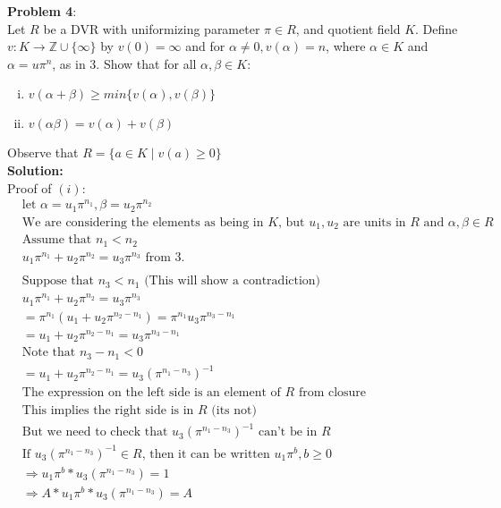 \documentclass[11pt]{article}
\newcommand{\prob}[3]{\begin{flushleft}
        \textbf{Problem #1}: \\
        #2 
		\textbf{Solution:} 
		#3

\end{flushleft}}
\begin{document}
\prob{4}{
  Let $R$ be a DVR with uniformizing parameter $\pi \in R$, and quotient field $K$. Define $v : K \rightarrow \mathbb{Z} \cup \{ \infty \}$ by $v(0) = \infty$ and for $\alpha \neq 0, v(\alpha) =n$, where $\alpha \in K$ and $\alpha = u \pi^n$, as in 3. Show that for all $\alpha, \beta \in K$:
  \begin{enumerate}[(i)]
    \item $v(\alpha + \beta) \geq min\{ v(\alpha), v(\beta) \}$
    \item $v(\alpha \beta) = v(\alpha) + v(\beta)$
  \end{enumerate}
  Observe that $R = \{ a \in K \mid v(a) \geq 0 \}$ \\
}{ \\
  Proof of $(i)$:
  \newline
\begin{align*}
&\text{let } \alpha = u_1 \pi ^ {n_1}, \beta = u_2 \pi ^{n_2}\\
&\text{We are considering the elements as being in $K$, but $u_1, u_2$ are units in $R$ and $\alpha, \beta \in R$}\\
&\text{Assume that $n_1 < n_2$}\\
&u_1 \pi ^ {n_1} + u_2 \pi ^{n_2} = u_3 \pi ^ {n_3} \text{ from 3.}\\
&\\
&\text{Suppose that $n_3 < n_1$ (This will show a contradiction)}\\
&u_1 \pi ^ {n_1} + u_2 \pi ^{n_2} = u_3 \pi ^{ n_3}\\
& = \pi ^ {n_1}(u_1 + u_2 \pi ^{n_2-n_1}) = \pi ^{n_1} u_3 \pi ^ {n_3-n_1}\\
& = u_1 + u_2 \pi ^{n_2-n_1} = u_3 \pi ^ {n_3-n_1}\\
&\text{Note that $n_3-n_1 < 0$}\\
& = u_1 + u_2 \pi ^{n_2-n_1} = u_3 \left( \pi ^ {n_1-n_3} \right)^{-1}\\
&\text{The expression on the left side is an element of $R$ from closure}\\
&\text{This implies the right side is in $R$ (its not)}\\
&\text{But we need to check that $u_3 \left( \pi ^ {n_1-n_3} \right)^{-1}$ can't be in $R$}\\
&\text{If $u_3 \left( \pi ^ {n_1-n_3} \right)^{-1} \in R$, then it can be written $u_1 \pi ^b, b \geq 0$}\\
&\Rightarrow u_1 \pi ^b * u_3 \left( \pi ^ {n_1-n_3} \right) = 1\\
&\Rightarrow A * u_1 \pi ^b * u_3 \left( \pi ^ {n_1-n_3} \right) = A\\

\end{align*}}
\end{document}
